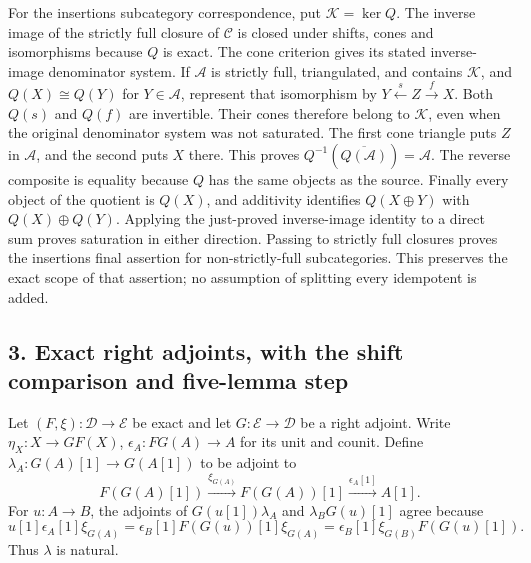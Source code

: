 \documentclass[11pt]{article}
\begin{document}
For the insertion\textquotesingle s subcategory correspondence,\allowbreak{} put \(\mathcal K=\ker Q\). The inverse image of the strictly full closure of \(\mathcal C\) is closed under shifts,\allowbreak{} cones and isomorphisms because \(Q\) is exact. The cone criterion gives its stated inverse-image denominator system. If \(\mathcal A\) is strictly full,\allowbreak{} triangulated,\allowbreak{} and contains \(\mathcal K\),\allowbreak{} and \(Q(X)\cong Q(Y)\) for \(Y\in\mathcal A\),\allowbreak{} represent that isomorphism by \(Y\xleftarrow sZ\xrightarrow fX\). Both \(Q(s)\) and \(Q(f)\) are invertible. Their cones therefore belong to \(\mathcal K\),\allowbreak{} even when the original denominator system was not saturated. The first cone triangle puts \(Z\) in \(\mathcal A\),\allowbreak{} and the second puts \(X\) there. This proves \(Q^{-1}(\overline{Q(\mathcal A)})=\mathcal A\). The reverse composite is equality because \(Q\) has the same objects as the source. Finally every object of the quotient is \(Q(X)\),\allowbreak{} and additivity identifies \(Q(X\oplus Y)\) with \(Q(X)\oplus Q(Y)\). Applying the just-proved inverse-image identity to a direct sum proves saturation in either direction. Passing to strictly full closures proves the insertion\textquotesingle s final assertion for non-strictly-full subcategories. This preserves the exact scope of that assertion; no assumption of splitting every idempotent is added.

\subsection{\texorpdfstring{3. Exact right adjoints,\allowbreak{} with the shift comparison and five-lemma step}{3. Exact right  with the shift comparison and five-lemma step}}\label{proofs-1844-2401-exact-right-adjoints-with-the-shift-comparison-and-five-lemma-step}

Let \((F,\xi):\mathcal D\to\mathcal E\) be exact and let \(G:\mathcal E\to\mathcal D\) be a right adjoint. Write \(\eta_X:X\to GF(X)\),\allowbreak{} \(\epsilon_A:FG(A)\to A\) for its unit and counit. Define \(\lambda_A:G(A)[1]\to G(A[1])\) to be adjoint to \[
F(G(A)[1])\xrightarrow{\xi_{G(A)}}F(G(A))[1]
\xrightarrow{\epsilon_A[1]}A[1].
\] For \(u:A\to B\),\allowbreak{} the adjoints of \(G(u[1])\lambda_A\) and \(\lambda_B G(u)[1]\) agree because \[
u[1]\epsilon_A[1]\xi_{G(A)}
=\epsilon_B[1]F(G(u))[1]\xi_{G(A)}
=\epsilon_B[1]\xi_{G(B)}F(G(u)[1]).
\] Thus \(\lambda\) is natural.
\end{document}
